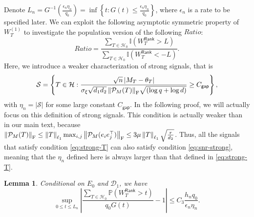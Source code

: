 \documentclass[12pt]{article}
\newcommand{\tF}{{\rm F}}
\newcommand{\abs}[1]{\left\lvert#1\right\rvert}
\newcommand{\norm}[1]{\left\lVert#1\right\rVert}
\newcommand{\PP}{\mathbb{P}}
\newcommand{\cH}{\mathcal{H}}
\newcommand{\cP}{\mathcal{P}}
\newcommand{\cD}{\mathcal{D}}
\newcommand{\cS}{\mathcal{S}}
\newcommand{\bbI}{\mathbb{I}}
\def\PP{{\mathbb P}}
\newtheorem{Lemma}{Lemma}
\theoremstyle{plain}
\begin{document}
Denote $L_n= G^{-1}( \frac{\epsilon_n \eta_n}{q_0})= \inf\left\{t:G(t)\le \frac{\epsilon_n \eta_n}{q_0}\right\}$, where $\epsilon_n$ is a rate to be specified later. We can exploit the following asymptotic symmetric property of ${W}^{(1)}_{T}$ to investigate the population version of the following $Ratio$:
\begin{equation*}
    Ratio=\frac{\sum_{T\in \cH_0  } \bbI(W_T^{\mathsf{Rank}} >L ) }{ \sum_{T\in \cH_0  } \bbI(W_T^{\mathsf{Rank}} <-L )}.
\end{equation*}
Here, we introduce a weaker characterization of strong signals, that is 
 \begin{equation}\label{eq:snr-strong}
        \cS = \left\{ T\in \cH: \frac{  \sqrt{n} \abs{M_T-\theta_T } }{ {\sigma_\xi \sqrt{d_1 d_2}\norm{\cP_M(T) }_{\tF} }  \sqrt{(\log q+\log d) } } \ge C_{\mathsf{gap} } \right\},
    \end{equation}   
    with $\eta_n=\abs{\cS}$ for some large constant $C_{\mathsf{gap} }$. In the following proof, we will actually focus on this definition of strong signals. This condition is actually weaker than in our main text, because $\norm{\cP_M(T)}_{\tF} \le \norm{T}_{\ell_1} \max_{i,j}\norm{ \cP_M(e_i e_j^\top) }_{\tF} \le 3 {\mu} \norm{T}_{\ell_1} \sqrt{\frac{r}{d_2} }$. Thus, all the signals that satisfy condition \eqref{eq:strong-T} can also satisfy condition \eqref{eq:snr-strong}, meaning that the $\eta_n$ defined here is always larger than that defined in \eqref{eq:strong-T}.

\begin{Lemma}\label{lemma:pop-wrank}  Conditional on $E_0$ and $\cD_1$, we have
\begin{equation*}
    \sup\limits_{0\le t \le L_n} \abs{\frac{ \sum_{T\in\cH_0}\PP(W_T^\mathsf{Rank} >t ) }{q_0 G(t) } -1 }\le C_3 \frac{h_n q_0}{\epsilon_n \eta_n }.
\end{equation*}
\end{Lemma}
\end{document}
